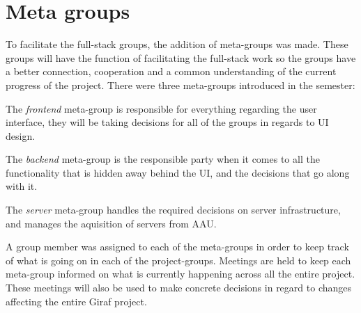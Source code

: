 \section{Meta groups}\label{SUBSEC:MetaGroups}
To facilitate the full-stack groups, the addition of meta-groups was made.
These groups will have the function of facilitating the full-stack work so the groups have a better connection, cooperation and a common understanding of the current progress of the project.
There were three meta-groups introduced in the semester:

The \textit{frontend} meta-group is responsible for everything regarding the user interface, they will be taking decisions for all of the groups in regards to UI design.

The \textit{backend} meta-group is the responsible party when it comes to all the functionality that is hidden away behind the UI, and the decisions that go along with it.

The \textit{server} meta-group handles the required decisions on server infrastructure, and manages the aquisition of servers from AAU.

A group member was assigned to each of the meta-groups in order to keep track of what is going on in each of the project-groups. Meetings are held to keep each meta-group informed on what is currently happening across all the entire project. These meetings will also be used to make concrete decisions in regard to changes affecting the entire Giraf project.
